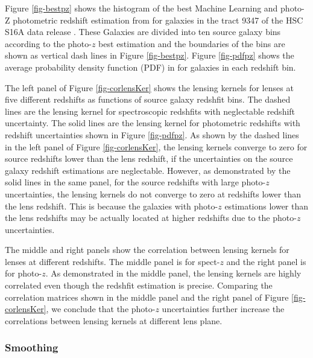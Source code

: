 \documentclass[twocolumn]{aastex62}
\begin{document}
Figure \ref{fig-bestpz} shows the histogram of the best Machine Learning and photo-Z \citep[MLZ]{MLZ-TPZ2013} photometric redshift estimation 
from \cite{HSC1-photoz} for galaxies in the tract 9347 of the HSC S16A data release \citep{HSC1-data}. These Galaxies are divided 
into ten source galaxy bins according to the photo-$z$ best estimation and the boundaries of the bins are shown as vertical dash 
lines in Figure \ref{fig-bestpz}. Figure \ref{fig-pdfpz} shows the average probability density function (PDF) in for galaxies 
in each redshift bin.

The left panel of Figure \ref{fig-corlensKer} shows the lensing kernels for lenses at five different redshifts as functions
of source galaxy redshfit bins. The dashed lines are the lensing kernel for spectroscopic redshfits with neglectable redshift
uncertainty. The solid lines are the lensing kernel for photometric redshifts with redshift uncertainties shown in Figure
\ref{fig-pdfpz}.
As shown by the dashed lines in the left panel of Figure \ref{fig-corlensKer}, the lensing kernels converge to zero for source
redshifts lower than the lens redshift, if the uncertainties on the source galaxy redshift estimations are neglectable. However,
as demonstrated by the solid lines in the same panel, for the source redshifts with large photo-$z$ uncertainties, the lensing
kernels do not converge to zero at redshifts lower than the lens redshift. This is because the galaxies with photo-$z$ estimations
lower than the lens redshifts may be actually located at higher redshifts due to the photo-$z$ uncertainties.

The middle and right panels show the correlation between lensing kernels for lenses at different redshifts. The middle panel is for
spect-$z$ and the right panel is for photo-$z$.
As demonstrated in the middle panel, the lensing kernels are highly correlated even though the redshfit estimation is precise.
Comparing the correlation matrices shown in the middle panel and the right panel of Figure \ref{fig-corlensKer}, we conclude
that the photo-$z$ uncertainties further increase the correlations between lensing kernels at different lens plane.

\subsubsection{Smoothing}
\label{subsec:method-smoothing}
\end{document}
